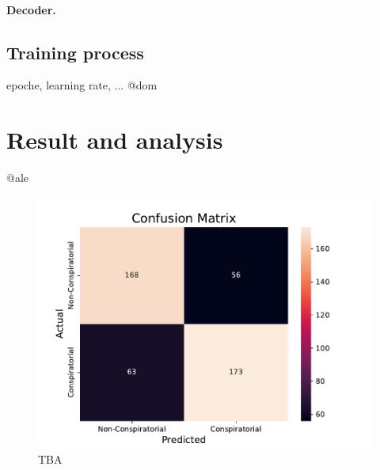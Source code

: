 \documentclass[11pt]{article}
\begin{document}
\begin{enumerate*}[label=(\roman*)]

\paragraph{Decoder.}


\subsection{Training process}\label{sec:training-process}
epoche, learning rate, ... @dom

\section{Result and analysis}\label{sec:results-analysis}
@ale
\begin{figure}
  \centering
  \includegraphics[width=\columnwidth]{figures/decoder-only-confusion-matrix.pdf}
  \caption{
   TBA}
  \label{fig:decoder-only-cm}
\end{figure}


\end{enumerate*}
\end{document}
